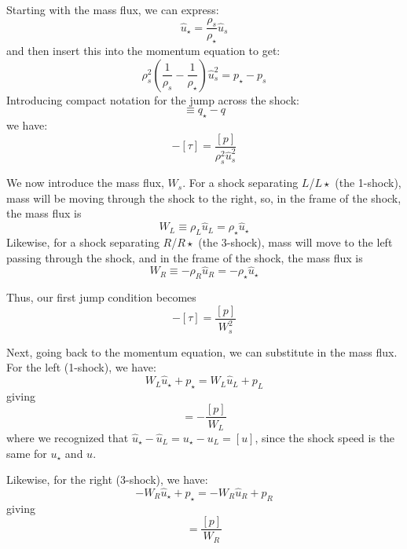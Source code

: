 Starting with the mass flux, we can express:
\begin{equation}
\hat{u}_\star = \frac{\rho_s}{\rho_\star} \hat{u}_s
\end{equation}
and then insert this into the momentum equation to get:
\begin{equation}
\rho_s^2 \left ( \frac{1}{\rho_s} - \frac{1}{\rho_\star} \right ) \hat{u}_s^2 = p_\star - p_s
\end{equation}
Introducing compact notation for the jump across the shock:
\begin{equation}
[q] \equiv q_\star - q
\end{equation}
we have:
\begin{equation}
-[\tau] = \frac{[p]}{\rho_s^2 \hat{u}_s^2}
\end{equation}

We now introduce the mass flux, $W_s$.  For a shock separating
$L$/$L\star$ (the 1-shock), mass will be moving through the shock to the
right, so, in the frame of the shock, the mass flux is
\begin{equation}
W_L \equiv \rho_L \hat{u}_L = \rho_\star \hat{u}_\star
\end{equation}
Likewise, for a shock separating $R$/$R\star$ (the 3-shock), mass will
move to the left passing through the shock, and in the frame of the
shock, the mass flux is
\begin{equation}
W_R \equiv -\rho_R \hat{u}_R = -\rho_\star \hat{u}_\star
\end{equation}

Thus, our first jump condition becomes
\begin{equation}
-[\tau] = \frac{[p]}{W_s^2}
\end{equation}

Next, going back to the momentum equation, we can substitute in the
mass flux.  For the left (1-shock), we have:
\begin{equation}
W_L \hat{u}_\star + p_\star = W_L \hat{u}_L + p_L
\end{equation}
giving
\begin{equation}
[u] = -\frac{[p]}{W_L}
\end{equation}
where we recognized that $\hat{u}_\star - \hat{u}_L = u_\star - u_L =
[u]$, since the shock speed is the same for $u_\star$ and $u$.

Likewise, for the right (3-shock), we have:
\begin{equation}
-W_R \hat{u}_\star + p_\star = -W_R \hat{u}_R + p_R
\end{equation}
giving
\begin{equation}
[u] = \frac{[p]}{W_R}
\end{equation}

